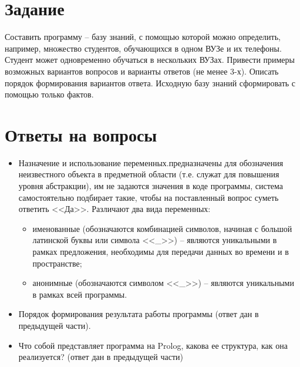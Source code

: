 \documentclass[14pt,a4paper]{scrreprt}
\begin{document}
\section{Задание}

Составить программу – базу знаний, с помощью которой можно определить, например,
множество студентов, обучающихся в одном ВУЗе и их телефоны. Студент может
одновременно обучаться в нескольких ВУЗах. Привести примеры возможных вариантов
вопросов и варианты ответов (не менее 3-х). Описать порядок формирования вариантов
ответа. Исходную базу знаний сформировать с помощью только фактов.

\section{Ответы на вопросы}

\begin{itemize}
	\item Назначение и использование переменных. предназначены для обозначения неизвестного объекта в предметной области (т.е. служат для повышения уровня абстракции), им не задаются значения в коде программы, система самостоятельно подбирает такие, чтобы на поставленный вопрос суметь ответить <<Да>>. Различают два вида переменных:
	\begin{itemize}
		\item именованные (обозначаются комбинацией символов, начиная с большой латинской буквы или символа <<\_>>) -- являются уникальными в рамках предложения, необходимы для передачи данных во времени и в пространстве;
		\item анонимные (обозначаются символом <<\_>>) -- являются уникальными в рамках всей программы.
	\end{itemize} 
	\item Порядок формирования результата работы программы (ответ дан в предыдущей части).
	\item Что собой представляет программа на Prolog, какова ее
	структура, как она реализуется? (ответ дан в предыдущей части)
\end{itemize}
\end{document}
